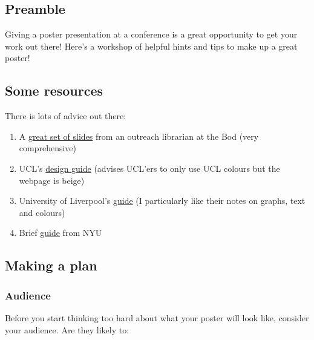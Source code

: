 \documentclass[
]{article}
\author{}
\date{\vspace{-2.5em}}
\providecommand{\tightlist}{%
  \setlength{\itemsep}{0pt}\setlength{\parskip}{0pt}}
\begin{document}
\subsection{Preamble}\label{preamble}

Giving a poster presentation at a conference is a great opportunity to
get your work out there! Here's a workshop of helpful hints and tips to
make up a great poster!

\subsection{Some resources}\label{some-resources}

There is lots of advice out there:

\begin{enumerate}
\def\labelenumi{\arabic{enumi}.}
\tightlist
\item
  A
  \href{https://www.bodleian.ox.ac.uk/sites/default/files/bodreader/documents/media/iskills-designing-conference-poster.pdf}{great
  set of slides} from an outreach librarian at the Bod (very
  comprehensive)
\item
  UCL's
  \href{https://www.ucl.ac.uk/creative-services/printing-services/designing-your-poster}{design
  guide} (advises UCL'ers to only use UCL colours but the webpage is
  beige)
\item
  University of Liverpool's
  \href{https://www.liverpool.ac.uk/media/livacuk/computingservices/printing/making-an-impact-with-your-poster.pdf}{guide}
  (I particularly like their notes on graphs, text and colours)
\item
  Brief \href{https://guides.nyu.edu/posters}{guide} from NYU
\end{enumerate}

\subsection{Making a plan}\label{making-a-plan}

\subsubsection{Audience}\label{audience}

Before you start thinking too hard about what your poster will look
like, consider your audience. Are they likely to:
\end{document}
